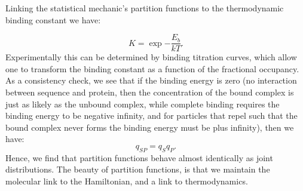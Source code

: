 Linking the statistical mechanic's partition functions to the thermodynamic binding constant we have:

\begin{equation}\label{k}
 K = \exp{-\frac{E_b}{kT} }.
\end{equation}
   Experimentally this can be determined by binding titration curves, which allow one to transform the binding constant as a function of the fractional occupancy.  As a consistency check, we see that if the binding energy is zero (no interaction between sequence and protein, then the concentration of the bound complex is just as likely as the unbound complex, while complete binding requires the binding energy to be negative infinity, and for particles that repel such that the bound complex never forms the binding energy must be plus infinity), then we have:
\begin{equation}\label{}
  q_{SP} = q_S q_P.
\end{equation}
Hence, we find that partition functions behave almost identically as joint distributions.  The beauty of partition functions, is that we maintain the molecular link to the Hamiltonian, and a link to thermodynamics.
